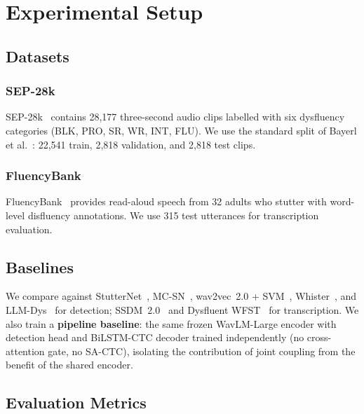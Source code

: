 \documentclass[cameraready]{Interspeech}
\begin{document}
\section{Experimental Setup}
\label{sec:experiments}

\subsection{Datasets}

\subsubsection{SEP-28k}
SEP-28k~\cite{lea2021sep28k} contains 28,177 three-second audio clips
labelled with six dysfluency categories (BLK, PRO, SR, WR, INT, FLU).
We use the standard split of Bayerl et al.~\cite{bayerl2022influence}:
22,541 train, 2,818 validation, and 2,818 test clips.

\subsubsection{FluencyBank}
FluencyBank~\cite{ratner2018fluencybank} provides read-aloud speech from
32 adults who stutter with word-level disfluency annotations. We use
315 test utterances for transcription evaluation.

\subsection{Baselines}

We compare against StutterNet~\cite{sheikh2021stutternet},
MC-SN~\cite{sheikh2023advancing}, wav2vec~2.0 + SVM~\cite{bayerl2022detecting},
Whister~\cite{changawala2024whister}, and LLM-Dys~\cite{wagner2024llm} for
detection; SSDM~2.0~\cite{lian2025ssdm2} and Dysfluent
WFST~\cite{guo2025wfst} for transcription. We also train a
\textbf{pipeline baseline}: the same frozen WavLM-Large encoder with detection
head and BiLSTM-CTC decoder trained independently (no cross-attention gate, no
SA-CTC), isolating the contribution of joint coupling from the benefit of the
shared encoder.

\subsection{Evaluation Metrics}
\end{document}
